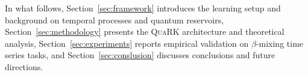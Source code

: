 
In what follows, Section~\ref{sec:framework} introduces the learning setup and background on temporal processes and quantum reservoirs, Section~\ref{sec:methodology} presents the \textsc{QuaRK} architecture and theoretical analysis, Section~\ref{sec:experiments} reports empirical validation on $\beta$-mixing time series tasks, and Section~\ref{sec:conslusion} discusses conclusions and future directions.
